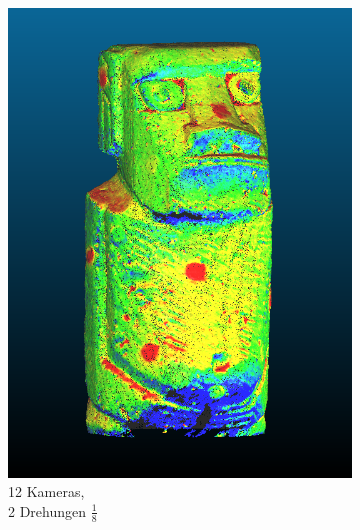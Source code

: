 \documentclass[./00PhotoBox.tex]{subfiles}
\begin{document}
\begin{figure}
\begin{subfigure}{0.24\textwidth}
        \includegraphics[width=1\linewidth]{img/cam_anzahl/everysecondoneturn.png}
        \centering
        \caption{12 Kameras,\\2 Drehungen $\frac{1}{8}$\\} %
        \label{img:moai_jede2K_mitDrehung} %
    \end{subfigure}
    \begin{subfigure}{0.24\textwidth}

\end{subfigure}
\end{figure}
\end{document}
